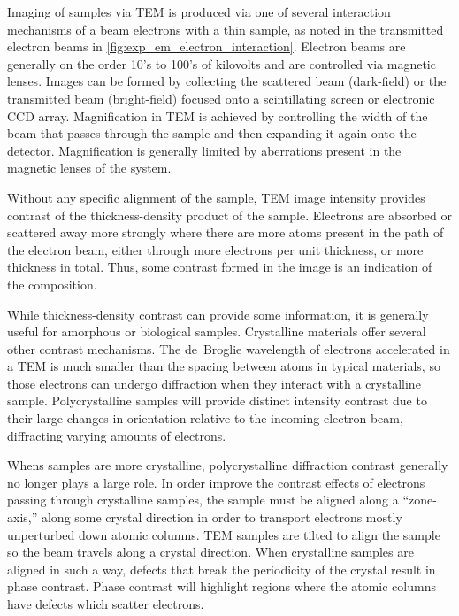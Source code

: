 Imaging of samples via TEM is produced via one of several interaction mechanisms of a beam electrons with a thin sample, as noted in the transmitted electron beams in \cref{fig:exp_em_electron_interaction}.
Electron beams are generally on the order 10's to 100's of kilovolts and are controlled via magnetic lenses\cite{Egerton2005}.
Images can be formed by collecting the scattered beam (dark-field) or the transmitted beam (bright-field) focused onto a scintillating screen or electronic CCD array.
Magnification in TEM is achieved by controlling the width of the beam that passes through the sample and then expanding it again onto the detector.
Magnification is generally limited by aberrations present in the magnetic lenses of the system.

Without any specific alignment of the sample, TEM image intensity provides contrast of the thickness-density product of the sample\cite{Egerton2005}.
Electrons are absorbed or scattered away more strongly where there are more atoms present in the path of the electron beam, either through more electrons per unit thickness, or more thickness in total.
Thus, some contrast formed in the image is an indication of the composition.

While thickness-density contrast can provide some information, it is generally useful for amorphous or biological samples.
Crystalline materials offer several other contrast mechanisms.
The de~Broglie wavelength of electrons accelerated in a TEM is much smaller than the spacing between atoms in typical materials, so those electrons can undergo diffraction when they interact with a crystalline sample.
Polycrystalline samples will provide distinct intensity contrast due to their large changes in orientation relative to the incoming electron beam, diffracting varying amounts of electrons\cite{Egerton2005}.

Whens samples are more crystalline, polycrystalline diffraction contrast generally no longer plays a large role.
In order improve the contrast effects of electrons passing through crystalline samples, the sample must be aligned along a ``zone-axis,'' along some crystal direction in order to transport electrons mostly unperturbed down atomic columns.
TEM samples are tilted to align the sample so the beam travels along a crystal direction.
When crystalline samples are aligned in such a way, defects that break the periodicity of the crystal result in phase contrast.
Phase contrast will highlight regions where the atomic columns have defects which scatter electrons\cite{Egerton2005}.

